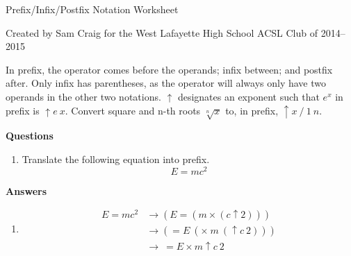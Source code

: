 \documentclass[12pt,letterpaper,fleqn]{article}
\begin{document}
\begin{center}
  Prefix/Infix/Postfix Notation Worksheet

  Created by Sam Craig for the West Lafayette High School ACSL Club of 2014--2015
\end{center}

In prefix, the operator comes before the operands; infix between; and postfix after.
Only infix has parentheses, as the operator will always only have two operands in the other two notations.
$\uparrow$ designates an exponent such that $e^x$ in prefix is $\uparrow e\ x$.
Convert square and n-th roots $\sqrt[n]{x}$ to, in prefix, $\uparrow x\ /\ 1\ n$.

\bigskip
\noindent \textbf{Questions}

\begin{enumerate}

\item Translate the following equation into prefix.
  \[
  E = mc^2
  \]

\end{enumerate}

\pagebreak
\noindent \textbf{Answers}

\begin{enumerate}

\item \begin{align*}
  E = mc^2 &\rightarrow (E = (m \times (c \uparrow 2))) \\
  &\rightarrow (= E\ (\times\ m\ (\uparrow c\ 2))) \\
  &\rightarrow\ = E \times m \uparrow c\ 2
\end{align*}

\end{enumerate}
\end{document}
